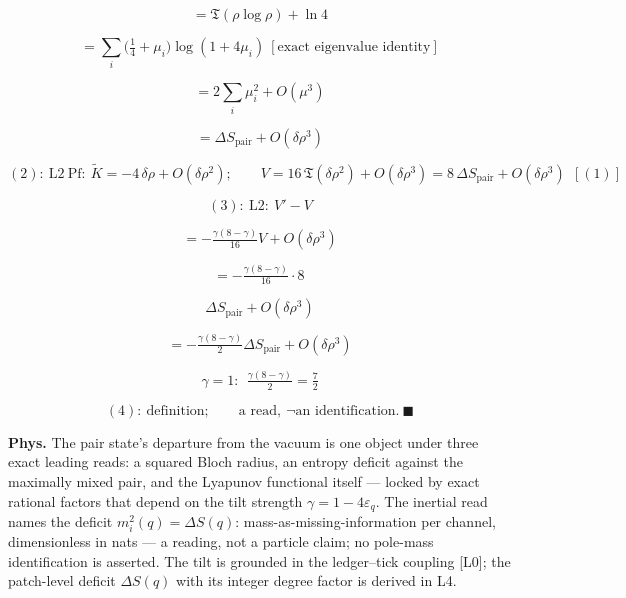 \begin{theorem}
\[
= \mathfrak T(\rho\log\rho)+\ln4
\]

\[
= \textstyle\sum_i\bigl(\tfrac14+\mu_i\bigr)\log(1+4\mu_i)\ [\text{exact eigenvalue identity}]
\]

\[
= 2\textstyle\sum_i\mu_i^2+O(\mu^3)
\]

\[
= \Delta S_{\mathrm{pair}}+O(\delta\rho^3)
\]

\[
(2):\ \mathrm{L2}\ \text{Pf}:\ \tilde K=-4\,\delta\rho+O(\delta\rho^2);\qquad V=16\,\mathfrak T(\delta\rho^2)+O(\delta\rho^3)=8\,\Delta S_{\mathrm{pair}}+O(\delta\rho^3)\ \ [(1)]
\]

\[
(3):\ \mathrm{L2}:\ V'-V
\]

\[
= -\tfrac{\gamma(8-\gamma)}{16}V+O(\delta\rho^3)
\]

\[
= -\tfrac{\gamma(8-\gamma)}{16}\cdot8\,
\]

\[
\Delta S_{\mathrm{pair}}+O(\delta\rho^3)
\]

\[
= -\tfrac{\gamma(8-\gamma)}{2}\Delta S_{\mathrm{pair}}+O(\delta\rho^3)
\]

\[
\gamma=1:\ \ \tfrac{\gamma(8-\gamma)}{2}=\tfrac72
\]

\[
(4):\ \text{definition};\qquad\text{a read},\ \neg\text{an identification}.\ \blacksquare
\]

\textbf{Phys.} The pair state's departure from the vacuum is one object under three exact leading reads: a squared Bloch radius, an entropy deficit against the maximally mixed pair, and the Lyapunov functional itself — locked by exact rational factors that depend on the tilt strength $\gamma=1-4\varepsilon_q$. The inertial read names the deficit $m_i^2(q)=\Delta S(q)$: mass-as-missing-information per channel, dimensionless in nats — a reading, not a particle claim; no pole-mass identification is asserted. The tilt is grounded in the ledger–tick coupling [L0]; the patch-level deficit $\Delta S(q)$ with its integer degree factor is derived in L4.

\end{theorem}

